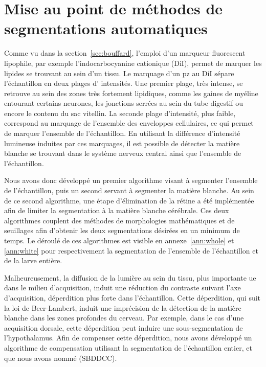 \documentclass[\main/main.tex]{subfiles}
\begin{document}
\section[Lempereur et al, MMTA, 2020]{\label{sec:lempereur_info}Mise au point de méthodes de segmentations automatiques}

%
Comme vu dans la section~\ref{sec:bouffard}, l'emploi d'un marqueur fluorescent lipophile, par exemple l'indocarbocyanine cationique (DiI), permet de marquer les lipides se trouvant au sein d'un tissu.
%
Le marquage d'un pz{} au DiI sépare l'échantillon en deux plages d' intensités.
%
Une premier plage, très intense,
se retrouve au sein des zones très fortement lipidiques,
comme les gaines de myéline entourant certains neurones,
les jonctions serrées au sein du tube digestif ou encore le contenu du sac vitellin.
%
La seconde plage d'intensité, plus faible, correspond au marquage de l'ensemble des
enveloppes cellulaires, ce qui permet de marquer l'ensemble de l'échantillon.
%
En utilisant la différence d'intensité lumineuse induites par ces marquages,
il est possible de détecter la matière blanche se trouvant
dans le système nerveux central ainsi que l'ensemble de l'échantillon.

%
Nous avons donc développé un premier algorithme visant à segmenter l'ensemble de l'échantillon,
puis un second servant à segmenter la matière blanche.
%
Au sein de ce second algorithme, une étape d'élimination de la rétine a été implémentée
afin de limiter la segmentation à la matière blanche cérébrale.
%
Ces deux algorithmes couplent des méthodes de morphologies mathématiques et de seuillages
afin d'obtenir les deux segmentations désirées en un minimum de temps.
%
Le déroulé de ces algorithmes est visible en annexe~\ref{ann:whole} et \ref{ann:white}
pour respectivement la segmentation de l'ensemble de l'échantillon et de la larve entière.

%
Malheureusement, la diffusion de la lumière au sein du tissu, plus importante ue dans le milieu d'acquisition, induit une réduction du contraste suivant l'axe d'acquisition, déperdition plus forte dans l'échantillon.
%
Cette déperdition, qui suit la loi de Beer-Lambert, induit une imprécision de la détection de la matière blanche dans les zones profondes du cerveau.
%
Par exemple, dans le cas d'une acquisition dorsale,
cette déperdition peut induire une sous-segmentation de l'hypothalamus.
%
Afin de compenser cette déperdition, nous avons développé un algorithme de compensation
utilisant la segmentation de l'échantillon entier, et que nous avons nommé \sbddcc{} (SBDDCC).
\end{document}
